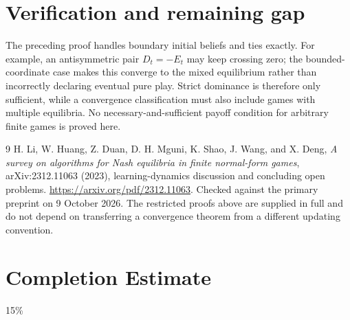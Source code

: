 \documentclass[11pt]{article}
\theoremstyle{definition}
\begin{document}
\section*{Verification and remaining gap}
The preceding proof handles boundary initial beliefs and ties exactly. For example, an antisymmetric pair $D_t=-E_t$ may keep crossing zero; the bounded-coordinate case makes this converge to the mixed equilibrium rather than incorrectly declaring eventual pure play. Strict dominance is therefore only sufficient, while a convergence classification must also include games with multiple equilibria. No necessary-and-sufficient payoff condition for arbitrary finite games is proved here.

\begin{thebibliography}{9}
 H. Li, W. Huang, Z. Duan, D. H. Mguni, K. Shao, J. Wang, and X. Deng, \emph{A survey on algorithms for Nash equilibria in finite normal-form games}, arXiv:2312.11063 (2023), learning-dynamics discussion and concluding open problems. \url{https://arxiv.org/pdf/2312.11063}. Checked against the primary preprint on 9 October 2026. The restricted proofs above are supplied in full and do not depend on transferring a convergence theorem from a different updating convention.
\end{thebibliography}

\section{Completion Estimate}
15\%
\end{document}
